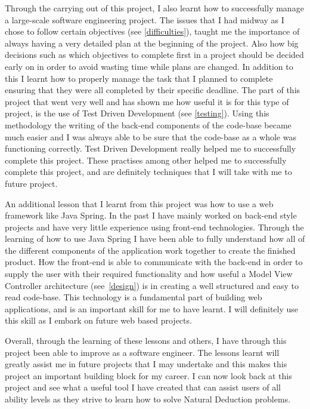 Through the carrying out of this project, I also learnt how to successfully manage a large-scale software engineering project. The issues that I had midway as I chose to follow certain objectives (see \ref{difficulties}), taught me the importance of always having a very detailed plan at the beginning of the project. Also how big decisions such as which objectives to complete first in a project should be decided early on in order to avoid wasting time while plans are changed. In addition to this I learnt how to properly manage the task that I planned to complete ensuring that they were all completed by their specific deadline. The part of this project that went very well and has shown me how useful it is for this type of project, is the use of Test Driven Development (see \ref{testing}). Using this methodology the writing of the back-end components of the code-base became much easier and I was always able to be sure that the code-base as a whole was functioning correctly. Test Driven Development really helped me to successfully complete this project. These practises among other helped me to successfully complete this project, and are definitely techniques that I will take with me to future project.

An additional lesson that I learnt from this project was how to use a web framework like Java Spring. In the past I have mainly worked on back-end style projects and have very little experience using front-end technologies. Through the learning of how to use Java Spring I have been able to fully understand how all of the different components of the application work together to create the finished product. How the front-end is able to communicate with the back-end in order to supply the user with their required functionality and how useful a Model View Controller architecture (see~\ref{design}) is in creating a well structured and easy to read code-base. This technology is a fundamental part of building web applications, and is an important skill for me to have learnt. I will definitely use this skill as I embark on future web based projects.

Overall, through the learning of these lessons and others, I have through this project been able to improve as a software engineer. The lessons learnt will greatly assist me in future projects that I may undertake and this makes this project an important building block for my career. I can now look back at this project and see what a useful tool I have created that can assist users of all ability levels as they strive to learn how to solve Natural Deduction problems.


